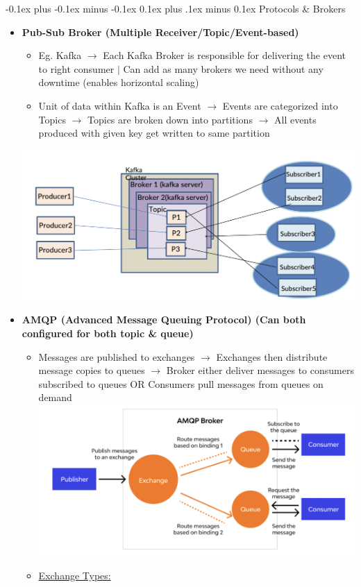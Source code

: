 \documentclass[landscape]{article}
\makeatletter
\renewcommand{\subsection}{\@startsection{subsection}{2}{0mm}%
  {-0.1ex plus -0.1ex minus -0.1ex}%
  {0.1ex plus .1ex minus 0.1ex}%
{\normalfont\scriptsize\bfseries}}
\makeatother
\begin{document}
\begin{multicols*}{5}
    \subsection{Protocols \& Brokers}
    \begin{itemize}
      \item \textbf{Pub-Sub Broker (Multiple Receiver/Topic/Event-based)}
      \begin{itemize}
        \item Eg. Kafka $\rightarrow$ Each Kafka Broker is responsible for delivering the event to right consumer $|$ Can add as many brokers we need without any downtime (enables horizontal scaling)
        \item Unit of data within Kafka is an Event $\rightarrow$ Events are categorized into Topics $\rightarrow$ Topics are broken down into partitions $\rightarrow$ All events produced with given key get written to same partition
      \end{itemize}
      \includegraphics[width=0.7\linewidth]{7_kafka.png}
      \item \textbf{AMQP (Advanced Message Queuing Protocol) (Can both configured for both topic \& queue)}
      \begin{itemize}
        \item Messages are published to exchanges $\rightarrow$ Exchanges then distribute message copies to queues $\rightarrow$ Broker either deliver messages to consumers subscribed to queues OR Consumers pull messages from queues on demand
        \includegraphics[width=0.75\linewidth]{8_AMQP_Broker.png}
        \item \underline{Exchange Types:} \\

\end{itemize}
\end{itemize}
\end{multicols*}
\end{document}
